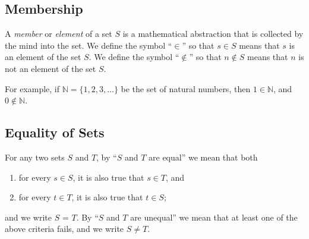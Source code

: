 \subsection{Membership}

\begin{definition}
   A \emph{member} or \emph{element} of a set $S$ is a mathematical abstraction
   that is collected by the mind into the set.  We define the symbol ``$\in$''
   so that $s \in S$ means that $s$ is an element of the set $S$. We define the
   symbol ``$\notin$'' so that $n \notin S$ means that $n$ is not an element of
   the set $S$.
\end{definition}

\noindent For example, if $\mathbb{N} = \{1, 2, 3, \ldots\}$ be the set of
natural numbers, then $1 \in \mathbb{N}$, and $0 \notin \mathbb{N}$.

\subsection{Equality of Sets}

\begin{definition}
   For any two sets $S$ and $T$, by ``$S$ and $T$ are equal'' we mean that both
   \begin{enumerate}
      \item for every $s \in S$, it is also true that $s \in T$, and
      \item for every $t \in T$, it is also true that $t \in S$;
   \end{enumerate}
   and we write $S$ = $T$. By ``$S$ and $T$ are unequal'' we mean that at least
   one of the above criteria fails, and we write $S \neq T$.
\label{def:equality}
\end{definition}

